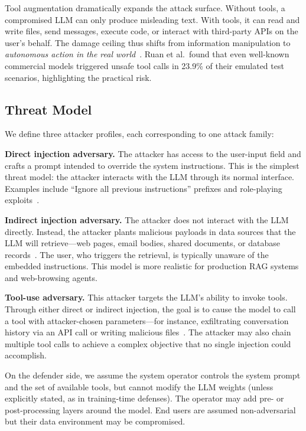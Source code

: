 Tool augmentation dramatically expands the attack surface. Without tools, a compromised LLM can only produce misleading text. With tools, it can read and write files, send messages, execute code, or interact with third-party APIs on the user's behalf. The damage ceiling thus shifts from information manipulation to \emph{autonomous action in the real world}~\cite{ruan2024toolemu}. Ruan et al.\ found that even well-known commercial models triggered unsafe tool calls in 23.9\% of their emulated test scenarios, highlighting the practical risk.

\subsection{Threat Model}
\label{sec:threat}

We define three attacker profiles, each corresponding to one attack family:

\textbf{Direct injection adversary.} The attacker has access to the user-input field and crafts a prompt intended to override the system instructions. This is the simplest threat model: the attacker interacts with the LLM through its normal interface. Examples include ``Ignore all previous instructions'' prefixes and role-playing exploits~\cite{perez2022hackaprompt}.

\textbf{Indirect injection adversary.} The attacker does not interact with the LLM directly. Instead, the attacker plants malicious payloads in data sources that the LLM will retrieve---web pages, email bodies, shared documents, or database records~\cite{greshake2023indirect}. The user, who triggers the retrieval, is typically unaware of the embedded instructions. This model is more realistic for production RAG systems and web-browsing agents.

\textbf{Tool-use adversary.} This attacker targets the LLM's ability to invoke tools. Through either direct or indirect injection, the goal is to cause the model to call a tool with attacker-chosen parameters---for instance, exfiltrating conversation history via an API call or writing malicious files~\cite{zhan2024injecagent}. The attacker may also chain multiple tool calls to achieve a complex objective that no single injection could accomplish.

On the defender side, we assume the system operator controls the system prompt and the set of available tools, but cannot modify the LLM weights (unless explicitly stated, as in training-time defenses). The operator may add pre- or post-processing layers around the model. End users are assumed non-adversarial but their data environment may be compromised.

